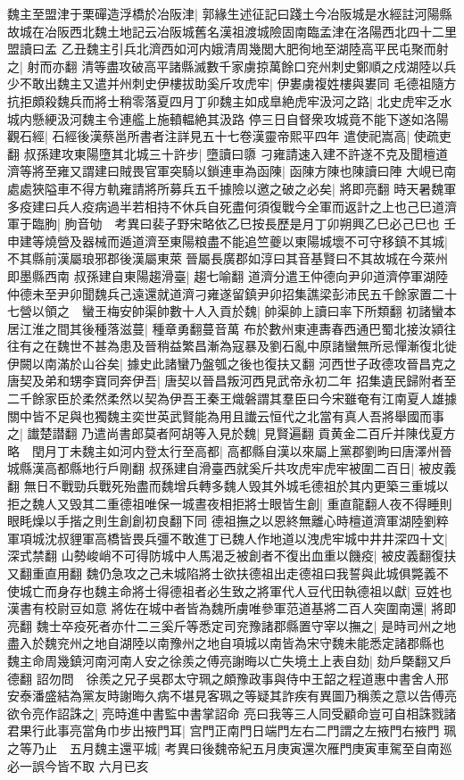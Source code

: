 魏主至盟津于栗磾造浮橋於冶阪津|{
	郭緣生述征記曰踐土今冶阪城是水經註河陽縣故城在冶阪西北魏土地記云冶阪城舊名漢祖渡城險固南臨孟津在洛陽西北四十二里盟讀曰孟}
乙丑魏主引兵北濟西如河内娥清周幾閭大肥徇地至湖陸高平民屯聚而射之|{
	射而亦翻}
清等盡攻破高平諸縣滅數千家虜掠萬餘口兖州刺史鄭順之戍湖陸以兵少不敢出魏主又遣并州刺史伊樓拔助奚斤攻虎牢|{
	伊婁虜複姓樓與婁同}
毛德祖隨方抗拒頗殺魏兵而將士稍零落夏四月丁卯魏主如成臯絶虎牢汲河之路|{
	北史虎牢乏水城内懸綆汲河魏主令連艦上施轒輼絶其汲路}
停三日自督衆攻城竟不能下遂如洛陽觀石經|{
	石經後漢蔡邕所書者注詳見五十七卷漢靈帝熙平四年}
遣使祀嵩高|{
	使疏吏翻}
叔孫建攻東陽墮其北城三十許步|{
	墮讀曰隳}
刁雍請速入建不許遂不克及聞檀道濟等將至雍又謂建曰賊畏官軍突騎以鎖連車為函陳|{
	函陳方陳也陳讀曰陣}
大峴已南處處狹隘車不得方軌雍請將所募兵五千據險以邀之破之必矣|{
	將即亮翻}
時天暑魏軍多疫建曰兵人疫病過半若相持不休兵自死盡何須復戰今全軍而返計之上也己巳道濟軍于臨朐|{
	朐音劬　考異曰裴子野宋略依乙巳按長歷是月丁卯朔興乙巳必己巳也}
壬申建等燒營及器械而遁道濟至東陽粮盡不能追竺夔以東陽城壞不可守移鎮不其城|{
	不其縣前漢屬琅邪郡後漢屬東萊晉屬長廣郡如淳曰其音基賢曰不其故城在今萊州即墨縣西南}
叔孫建自東陽趨滑臺|{
	趨七喻翻}
道濟分遣王仲德向尹卯道濟停軍湖陸仲德未至尹卯聞魏兵己遠還就道濟刁雍遂留鎮尹卯招集譙梁彭沛民五千餘家置二十七營以領之　蠻王梅安帥渠帥數十人入貢於魏|{
	帥渠帥上讀曰率下所類翻}
初諸蠻本居江淮之間其後種落滋蔓|{
	種章勇翻蔓音萬}
布於數州東連夀春西通巴蜀北接汝潁往往有之在魏世不甚為患及晉稍益繁昌漸為寇暴及劉石亂中原諸蠻無所忌憚漸復北徙伊闕以南滿於山谷矣|{
	據史此諸蠻乃盤瓠之後也復扶又翻}
河西世子政德攻晉昌克之唐契及弟和甥李寶同奔伊吾|{
	唐契以晉昌叛河西見武帝永初二年}
招集遺民歸附者至二千餘家臣於柔然柔然以契為伊吾王秦王熾磐謂其羣臣曰今宋雖奄有江南夏人雄據關中皆不足與也獨魏主奕世英武賢能為用且䜟云恒代之北當有真人吾將舉國而事之|{
	䜟楚譛翻}
乃遣尚書郎莫者阿胡等入見於魏|{
	見賢遍翻}
貢黄金二百斤并陳伐夏方略　閏月丁未魏主如河内登太行至高都|{
	高都縣自漢以來屬上黨郡劉昫曰唐澤州晉城縣漢高都縣地行戶剛翻}
叔孫建自滑臺西就奚斤共攻虎牢虎牢被圍二百日|{
	被皮義翻}
無日不戰勁兵戰死殆盡而魏增兵轉多魏人毁其外城毛德祖於其内更築三重城以拒之魏人又毁其二重德祖唯保一城晝夜相拒將士眼皆生創|{
	重直龍翻人夜不得睡則眼眊燥以手揩之則生創創初良翻下同}
德祖撫之以恩終無離心時檀道濟軍湖陸劉粹軍項城沈叔貍軍高橋皆畏兵彊不敢進丁已魏人作地道以洩虎牢城中井井深四十文|{
	深式禁翻}
山勢峻峭不可得防城中人馬渴乏被創者不復出血重以饑疫|{
	被皮義翻復扶又翻重直用翻}
魏仍急攻之己未城陷將士欲扶德祖出走德祖曰我誓與此城俱斃義不使城亡而身存也魏主命將士得德祖者必生致之將軍代人豆代田執德祖以獻|{
	豆姓也漢書有校尉豆如意}
將佐在城中者皆為魏所虜唯參軍范道基將二百人突圍南還|{
	將即亮翻}
魏士卒疫死者亦什二三奚斤等悉定司兖豫諸郡縣置守宰以撫之|{
	是時司州之地盡入於魏兖州之地自湖陸以南豫州之地自項城以南皆為宋守魏未能悉定諸郡縣也}
魏主命周幾鎮河南河南人安之徐羨之傅亮謝晦以亡失境土上表自劾|{
	劾戶槩翻又戶德翻}
詔勿問　徐羨之兄子吳郡太守珮之頗豫政事與侍中王韶之程道惠中書舍人邢安泰潘盛結為黨友時謝晦久病不堪見客珮之等疑其詐疾有異圖乃稱羨之意以告傅亮欲令亮作詔誅之|{
	亮時進中書監中書掌詔命}
亮曰我等三人同受顧命豈可自相誅戮諸君果行此事亮當角巾步出掖門耳|{
	宫門正南門日端門左右二門謂之左掖門右掖門}
珮之等乃止　五月魏主還平城|{
	考異曰後魏帝紀五月庚寅還次雁門庚寅車駕至自南廵必一誤今皆不取}
六月已亥


